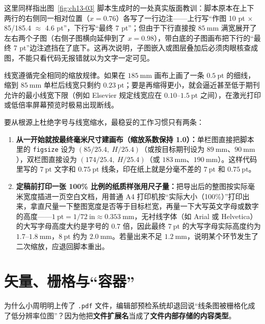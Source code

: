 这里同样指出图~\ref{fig:ch13-03} 脚本生成时的一处真实版面教训：脚本原本在上下两行的右侧同一相对位置（$x = 0.76$）各写了一行边注——上行写“作图 10 pt $\times$ 85/185.4 $\approx$ 4.6 pt”，下行写“最终 7 pt”；但由于下行直接按 $85\ \text{mm}$ 满宽展开了左右两个子图（右侧子图横向延伸到了 $x = 0.98$），带白底的子图画布把下行的“最终 7 pt”边注遮挡在了底下。这再次说明，子图嵌入或图层叠加后必须肉眼核查成图，不能只看代码无报错就以为文字一定可见。

线宽遵循完全相同的缩放规律。如果在 $185\ \text{mm}$ 画布上画了一条 $0.5\ \text{pt}$ 的细线，缩到 $85\ \text{mm}$ 单栏后线宽只剩约 $0.23\ \text{pt}$；要是再缩得更小，就会逼近甚至低于期刊允许的最小线宽下限（例如 Elsevier 规定线宽应在 $0.10\text{--}1.5\ \text{pt}$ 之间），在激光打印或低倍率屏幕预览时极易出现断线。

要从根源上杜绝字号与线宽缩水，最稳妥的工作习惯只有两条：
\begin{enumerate}
\item \textbf{从一开始就按最终毫米尺寸建画布（缩放系数保持 1.0）：}单栏图直接把脚本里的 \texttt{figsize} 设为 $(85/25.4,\ H/25.4)$（或按目标期刊设为 $89\ \text{mm}$、$90\ \text{mm}$），双栏图直接设为 $(174/25.4,\ H/25.4)$（或 $183\ \text{mm}$、$190\ \text{mm}$）。这样代码里写的 $7\ \text{pt}$ 文字和 $0.75\ \text{pt}$ 线条，印在纸上就是分毫不差的 $7\ \text{pt}$ 和 $0.75\ \text{pt}$。
\item \textbf{定稿前打印一张 100\% 比例的纸质样张用尺子量：}把导出后的整图按实际毫米宽度插进一页空白文档，用普通 A4 打印机按“实际大小（100\%）”打印出来，拿直尺量一下整图宽度是否等于目标栏宽，再量一下大写英文字母或数字的高度——$1\ \text{pt} = 1/72\ \text{in} \approx 0.353\ \text{mm}$，无衬线字体（如 Arial 或 Helvetica）的大写字母高度大约是字号的 $0.7$ 倍，因此最终 $7\ \text{pt}$ 的大写字母实际高度约为 $1.7\text{--}1.8\ \text{mm}$，$8\ \text{pt}$ 约为 $2.0\ \text{mm}$。若量出来不足 $1.2\ \text{mm}$，说明某个环节发生了二次缩放，应退回脚本重出。
\end{enumerate}

\section{矢量、栅格与“容器”}

为什么小周明明上传了 \texttt{.pdf} 文件，编辑部预检系统却退回说“线条图被栅格化成了低分辨率位图”？因为他把\textbf{文件扩展名}当成了\textbf{文件内部存储的内容类型}。

